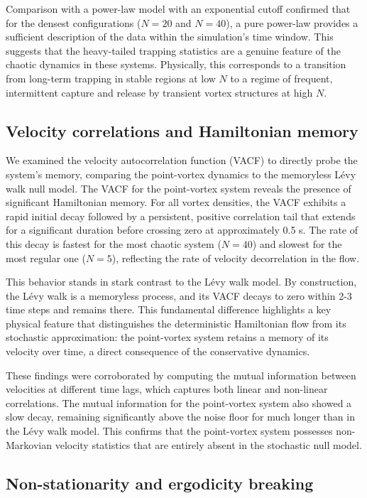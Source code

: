 \documentclass[]{article}
\begin{document}
Comparison with a power-law model with an exponential cutoff confirmed that for the densest configurations ($N=20$ and $N=40$), a pure power-law provides a sufficient description of the data within the simulation's time window. This suggests that the heavy-tailed trapping statistics are a genuine feature of the chaotic dynamics in these systems. Physically, this corresponds to a transition from long-term trapping in stable regions at low $N$ to a regime of frequent, intermittent capture and release by transient vortex structures at high $N$.

\subsection{Velocity correlations and Hamiltonian memory}

We examined the velocity autocorrelation function (VACF) to directly probe the system's memory, comparing the point-vortex dynamics to the memoryless L\'evy walk null model. The VACF for the point-vortex system reveals the presence of significant Hamiltonian memory. For all vortex densities, the VACF exhibits a rapid initial decay followed by a persistent, positive correlation tail that extends for a significant duration before crossing zero at approximately 0.5 s. The rate of this decay is fastest for the most chaotic system ($N=40$) and slowest for the most regular one ($N=5$), reflecting the rate of velocity decorrelation in the flow.

This behavior stands in stark contrast to the L\'evy walk model. By construction, the L\'evy walk is a memoryless process, and its VACF decays to zero within 2-3 time steps and remains there. This fundamental difference highlights a key physical feature that distinguishes the deterministic Hamiltonian flow from its stochastic approximation: the point-vortex system retains a memory of its velocity over time, a direct consequence of the conservative dynamics.

These findings were corroborated by computing the mutual information between velocities at different time lags, which captures both linear and non-linear correlations. The mutual information for the point-vortex system also showed a slow decay, remaining significantly above the noise floor for much longer than in the L\'evy walk model. This confirms that the point-vortex system possesses non-Markovian velocity statistics that are entirely absent in the stochastic null model.

\subsection{Non-stationarity and ergodicity breaking}
\end{document}
